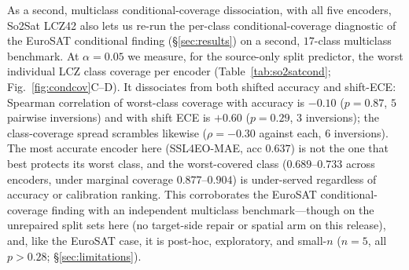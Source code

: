\documentclass[preprint,11pt,authoryear]{elsarticle}
\begin{document}
As a second, multiclass conditional-coverage dissociation, with all five encoders, So2Sat LCZ42
also lets us re-run the per-class conditional-coverage diagnostic of the EuroSAT conditional finding
(\S\ref{sec:results}) on a second, $17$-class multiclass benchmark. At $\alpha{=}0.05$ we measure, for the
source-only split predictor, the worst individual LCZ class coverage per encoder (Table~\ref{tab:so2satcond};
Fig.~\ref{fig:condcov}C--D).
It dissociates from both shifted accuracy and shift-ECE:
Spearman correlation of worst-class coverage with accuracy is $-0.10$ ($p{=}0.87$, $5$ pairwise inversions)
and with shift ECE is $+0.60$ ($p{=}0.29$, $3$ inversions);
the class-coverage spread scrambles likewise ($\rho=-0.30$ against each, $6$ inversions). The most accurate
encoder here (SSL4EO-MAE, acc $0.637$) is not the one that best protects its worst class, and the
worst-covered class ($0.689$--$0.733$ across encoders, under marginal coverage $0.877$--$0.904$) is
under-served regardless of accuracy or calibration ranking. This corroborates the EuroSAT
conditional-coverage finding with an independent multiclass benchmark---though on the unrepaired
split sets here (no target-side repair or spatial arm on this release), and, like the EuroSAT case, it is
post-hoc, exploratory, and small-$n$ ($n{=}5$, all $p>0.28$; \S\ref{sec:limitations}).

\begin{table}[htbp]\centering\small
\caption{Per-class conditional coverage on GEO-Bench So2Sat LCZ42 ($17$ LCZ classes; source-only
split-conformal, $\alpha{=}0.05$; 5 seeds). The worst individual-class coverage dissociates from shifted
accuracy and shift-ECE (Spearman $-0.10$ vs.\ accuracy, $+0.60$ vs.\ ECE; $5/3$ pairwise
inversions), a second multiclass instance of the EuroSAT conditional-coverage collapse.}\label{tab:so2satcond}
\end{table}
\end{document}
